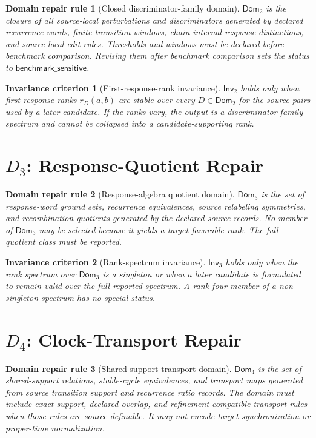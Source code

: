 \documentclass[11pt]{article}
\newcommand{\Dom}{\mathsf{Dom}}
\newcommand{\Inv}{\mathsf{Inv}}
\newtheorem{domainrule}{Domain repair rule}
\newtheorem{criterion}{Invariance criterion}
\begin{document}
\begin{domainrule}[Closed discriminator-family domain]
\(\Dom_2\) is the closure of all source-local perturbations and
discriminators generated by declared recurrence words, finite transition
windows, chain-internal response distinctions, and source-local edit rules.
Thresholds and windows must be declared before benchmark comparison. Revising
them after benchmark comparison sets the status to
\(\mathsf{benchmark\_sensitive}\).
\end{domainrule}

\begin{criterion}[First-response-rank invariance]
\(\Inv_2\) holds only when first-response ranks \(r_D(a,b)\) are stable over
every \(D\in\Dom_2\) for the source pairs used by a later candidate. If the
ranks vary, the output is a discriminator-family spectrum and cannot be
collapsed into a candidate-supporting rank.
\end{criterion}

\section{\texorpdfstring{\(D_3\)}{D3}: Response-Quotient Repair}

\begin{domainrule}[Response-algebra quotient domain]
\(\Dom_3\) is the set of response-word ground sets, recurrence equivalences,
source relabeling symmetries, and recombination quotients generated by the
declared source records. No member of \(\Dom_3\) may be selected because it
yields a target-favorable rank. The full quotient class must be reported.
\end{domainrule}

\begin{criterion}[Rank-spectrum invariance]
\(\Inv_3\) holds only when the rank spectrum over \(\Dom_3\) is a singleton
or when a later candidate is formulated to remain valid over the full
reported spectrum. A rank-four member of a non-singleton spectrum has no
special status.
\end{criterion}

\section{\texorpdfstring{\(D_4\)}{D4}: Clock-Transport Repair}

\begin{domainrule}[Shared-support transport domain]
\(\Dom_4\) is the set of shared-support relations, stable-cycle equivalences,
and transport maps generated from source transition support and recurrence
ratio records. The domain must include exact-support, declared-overlap, and
refinement-compatible transport rules when those rules are source-definable.
It may not encode target synchronization or proper-time normalization.
\end{domainrule}
\end{document}
